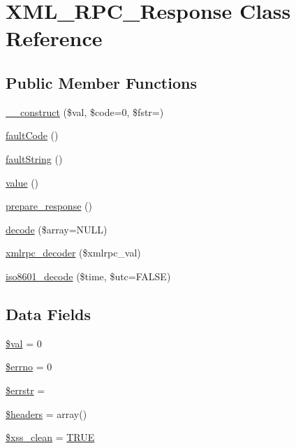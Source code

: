 \hypertarget{class_x_m_l___r_p_c___response}{}\section{X\+M\+L\+\_\+\+R\+P\+C\+\_\+\+Response Class Reference}
\label{class_x_m_l___r_p_c___response}
\subsection*{Public Member Functions}
\begin{DoxyCompactItemize}
\item 
\mbox{\hyperlink{class_x_m_l___r_p_c___response_a62cc1aaff0155564cfc1c280707a8f86}{\+\_\+\+\_\+construct}} (\$val, \$code=0, \$fstr=\textquotesingle{}\textquotesingle{})
\item 
\mbox{\hyperlink{class_x_m_l___r_p_c___response_ad6849a82f23db4d67e06a7fcaa94aec2}{fault\+Code}} ()
\item 
\mbox{\hyperlink{class_x_m_l___r_p_c___response_a2f922009ed0801616d3df198a48d193b}{fault\+String}} ()
\item 
\mbox{\hyperlink{class_x_m_l___r_p_c___response_aefbfa229f1c9e1fc967bff724a010f9e}{value}} ()
\item 
\mbox{\hyperlink{class_x_m_l___r_p_c___response_ac6925a06291928e6d4e8e53ea10fb1e2}{prepare\+\_\+response}} ()
\item 
\mbox{\hyperlink{class_x_m_l___r_p_c___response_a03c0253c215ae6aaafc6a949276b06bd}{decode}} (\$array=N\+U\+LL)
\item 
\mbox{\hyperlink{class_x_m_l___r_p_c___response_a44f453c58a4aad3ccb76dd9926f9fa64}{xmlrpc\+\_\+decoder}} (\$xmlrpc\+\_\+val)
\item 
\mbox{\hyperlink{class_x_m_l___r_p_c___response_afd1f70f703eb82303e1199e8653c9c44}{iso8601\+\_\+decode}} (\$time, \$utc=F\+A\+L\+SE)
\end{DoxyCompactItemize}
\subsection*{Data Fields}
\begin{DoxyCompactItemize}
\item 
\mbox{\hyperlink{class_x_m_l___r_p_c___response_aac81a74a7b30767af29bfd9a695636df}{\$val}} = 0
\item 
\mbox{\hyperlink{class_x_m_l___r_p_c___response_a2be10a914e39a6b1f855ddf3b9a21367}{\$errno}} = 0
\item 
\mbox{\hyperlink{class_x_m_l___r_p_c___response_a126a4369646afcf007816bfa8c208d11}{\$errstr}} = \textquotesingle{}\textquotesingle{}
\item 
\mbox{\hyperlink{class_x_m_l___r_p_c___response_a52500036ee807241b8b4b7e2367c49ef}{\$headers}} = array()
\item 
\mbox{\hyperlink{class_x_m_l___r_p_c___response_a0f2ee8861c0b3164a5c6e126dd98c0cc}{\$xss\+\_\+clean}} = \mbox{\hyperlink{constants_8php_ae04a3efe6aa42044f803ee90c2277846}{T\+R\+UE}}
\end{DoxyCompactItemize}



